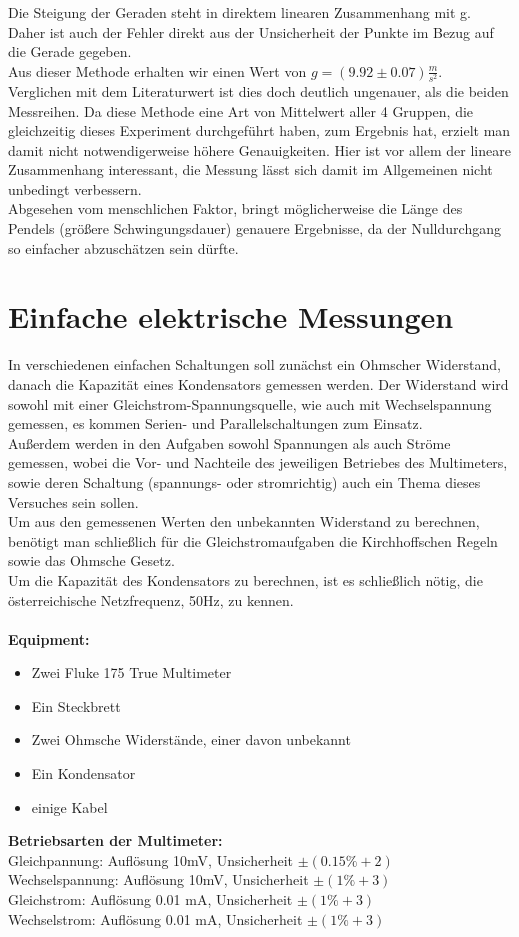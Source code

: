 \documentclass[12pt,a4paper]{article}
\begin{document}
\begin{multicols}{2}
Die Steigung der Geraden steht in direktem linearen Zusammenhang mit g. Daher ist auch der Fehler direkt aus der Unsicherheit der Punkte im Bezug auf die Gerade gegeben.\\
Aus dieser Methode erhalten wir einen Wert von $g = (9.92 \pm 0.07) \frac{m}{s^2}$.\\
Verglichen mit dem Literaturwert ist dies doch deutlich ungenauer, als die beiden Messreihen. Da diese Methode eine Art von Mittelwert aller 4 Gruppen, die gleichzeitig dieses Experiment durchgeführt haben, zum Ergebnis hat, erzielt man damit nicht notwendigerweise höhere Genauigkeiten. Hier ist vor allem der lineare Zusammenhang interessant, die Messung lässt sich damit im Allgemeinen nicht unbedingt verbessern.\\
Abgesehen vom menschlichen Faktor, bringt möglicherweise die Länge des Pendels (größere Schwingungsdauer) genauere Ergebnisse, da der Nulldurchgang so einfacher abzuschätzen sein dürfte.
\section{Einfache elektrische Messungen}
In verschiedenen einfachen Schaltungen soll zunächst ein Ohmscher Widerstand, danach die Kapazität eines Kondensators gemessen werden. Der Widerstand wird sowohl mit einer Gleichstrom-Spannungsquelle, wie auch mit Wechselspannung gemessen, es kommen Serien- und Parallelschaltungen zum Einsatz.\\
Außerdem werden in den Aufgaben sowohl Spannungen als auch Ströme gemessen, wobei die Vor- und Nachteile des jeweiligen Betriebes des Multimeters, sowie deren Schaltung (spannungs- oder stromrichtig) auch ein Thema dieses Versuches sein sollen.\\
Um aus den gemessenen Werten den unbekannten Widerstand zu berechnen, benötigt man schließlich für die Gleichstromaufgaben die Kirchhoffschen Regeln sowie das Ohmsche Gesetz.\\
Um die Kapazität des Kondensators zu berechnen, ist es schließlich nötig, die österreichische Netzfrequenz, 50Hz, zu kennen.\\
\\
\textbf{Equipment:}\\
\begin{itemize}
	\item Zwei Fluke 175 True Multimeter 
	\item Ein Steckbrett
	\item Zwei Ohmsche Widerstände, einer davon unbekannt
	\item Ein Kondensator
	\item einige Kabel
\end{itemize}
\textbf{Betriebsarten der Multimeter:}\\
Gleichpannung:   Auflösung 10mV, Unsicherheit $\pm (0.15\% + 2)$\\
Wechselspannung: Auflösung 10mV, Unsicherheit $\pm (1\% + 3)$\\
Gleichstrom:     Auflösung 0.01 mA, Unsicherheit $\pm (1\% + 3)$\\
Wechselstrom:    Auflösung 0.01 mA, Unsicherheit $\pm (1\% + 3)$\\

\end{multicols}
\end{document}
